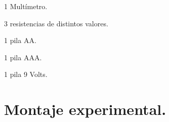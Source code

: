 \documentclass[14pt]{extarticle}
\begin{document}
\begin{enumerate}[label=\roman*)]
\begin{minipage}[t]{8cm}
\item 1 Multímetro.
\item 3 resistencias de distintos valores.
\item 1 pila AA.
\end{minipage}
\hspace{1cm}
\begin{minipage}[t]{4cm}
\item 1 pila AAA.
\item 1 pila 9 Volts.
\end{minipage}
\end{enumerate}


\section{Montaje experimental.}
\end{document}
